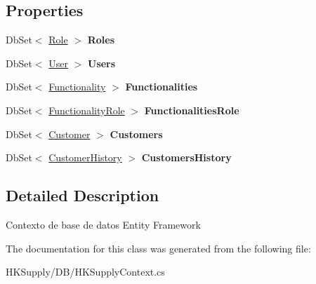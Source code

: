 \subsection*{Properties}
\begin{DoxyCompactItemize}
\item 
\mbox{\label{class_h_k_supply_1_1_d_b_1_1_h_k_supply_context_aa13a9d69d5f081b45c75059370ae3201}} 
Db\+Set$<$ \hyperlink{class_h_k_supply_1_1_models_1_1_role}{Role} $>$ {\bfseries Roles}
\item 
\mbox{\label{class_h_k_supply_1_1_d_b_1_1_h_k_supply_context_a2b7cfcd66fb7b707906ec3da46ee099f}} 
Db\+Set$<$ \hyperlink{class_h_k_supply_1_1_models_1_1_user}{User} $>$ {\bfseries Users}
\item 
\mbox{\label{class_h_k_supply_1_1_d_b_1_1_h_k_supply_context_a54ca6fe82e2574c81705e6b3686a1ce3}} 
Db\+Set$<$ \hyperlink{class_h_k_supply_1_1_models_1_1_functionality}{Functionality} $>$ {\bfseries Functionalities}
\item 
\mbox{\label{class_h_k_supply_1_1_d_b_1_1_h_k_supply_context_ad7edaaaf095a352171c4903fb774a482}} 
Db\+Set$<$ \hyperlink{class_h_k_supply_1_1_models_1_1_functionality_role}{Functionality\+Role} $>$ {\bfseries Functionalities\+Role}
\item 
\mbox{\label{class_h_k_supply_1_1_d_b_1_1_h_k_supply_context_a61798023df843c12bca882cb94bcda49}} 
Db\+Set$<$ \hyperlink{class_h_k_supply_1_1_models_1_1_customer}{Customer} $>$ {\bfseries Customers}
\item 
\mbox{\label{class_h_k_supply_1_1_d_b_1_1_h_k_supply_context_a07e9712da54d17365dcc738168829127}} 
Db\+Set$<$ \hyperlink{class_h_k_supply_1_1_models_1_1_customer_history}{Customer\+History} $>$ {\bfseries Customers\+History}
\end{DoxyCompactItemize}


\subsection{Detailed Description}
Contexto de base de datos Entity Framework 



The documentation for this class was generated from the following file\+:\begin{DoxyCompactItemize}
\item 
H\+K\+Supply/\+D\+B/H\+K\+Supply\+Context.\+cs\end{DoxyCompactItemize}

